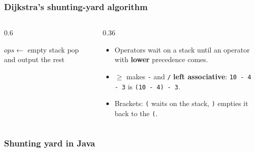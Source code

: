 \documentclass[aspectratio=169,10pt,compress]{beamer}
\begin{document}




\begin{frame}[t,fragile] \frametitle{Dijkstra's shunting-yard algorithm}
  \begin{columns}[T]
    \begin{column}{0.6\textwidth}
      \SetAlFnt{\footnotesize}


\begin{algorithm}[H]
  \caption{InfixToPostfix}
  $ops \gets$ empty stack\;
  pop and output the rest\;
\end{algorithm}

    \end{column}
    \begin{column}{0.36\textwidth}
      \begin{itemize}\small
        \item Operators wait on a stack until an operator with \textbf{lower} precedence comes.
        \item $\ge$ makes \texttt{-} and \texttt{/} \textbf{left associative}: \texttt{10 - 4 - 3} is \texttt{(10 - 4) - 3}.
        \item Brackets: \texttt{(} waits on the stack, \texttt{)} empties it back to the \texttt{(}.
      \end{itemize}
    \end{column}
  \end{columns}
\end{frame}




\begin{frame}[t,fragile] \frametitle{Shunting yard in Java}
\end{frame}
\end{document}
